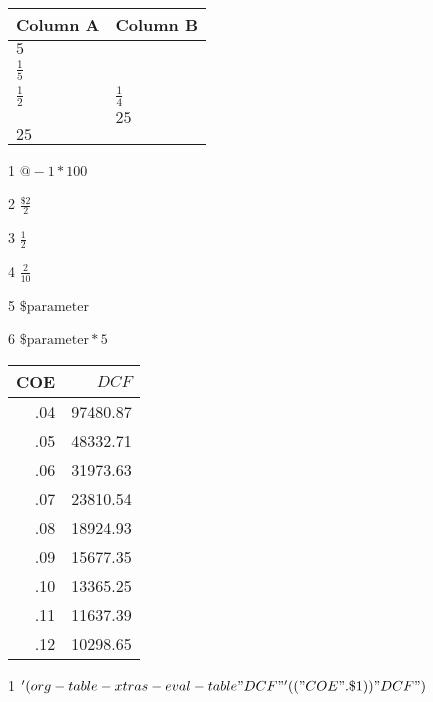 \documentclass[11pt]{article}
\begin{document}
\begin{table}
\centering
\begin{threeparttable}

\begin{tabular}{l|l}
Column A & Column B\\
\hline
\(5\)\tnote{5} & \\
\(\frac{1}{5}\)\tnote{4} & \\
\(\frac{1}{2}\)\tnote{3} & \(\frac{1}{4}\)\tnote{2}\\
 & \(25\)\tnote{1}\\
\(25\)\tnote{6} & \\
\hline
\end{tabular}

\begin{tablenotes}
\item [1] \(@-1*100\)
\item [2] \(\frac{\$2}{2}\)
\item [3] \(\frac{1}{2}\)
\item [4] \(\frac{2}{10}\)
\item [5] \(\mbox{\$parameter}\)
\item [6] \(\mbox{\$parameter}*5\)
\end{tablenotes}

\end{threeparttable}
\end{table}



\begin{table}
\centering
\begin{threeparttable}

\begin{tabular}{rr}
COE & \(DCF\)\tnote{1}\\
\hline
.04 & 97480.87\\
.05 & 48332.71\\
.06 & 31973.63\\
.07 & 23810.54\\
.08 & 18924.93\\
.09 & 15677.35\\
.10 & 13365.25\\
.11 & 11637.39\\
.12 & 10298.65\\
\end{tabular}

\begin{tablenotes}
\item [1] \('(org-table-xtras-eval-table "DCF" '(("COE" . \$1)) "DCF")\)
\end{tablenotes}

\end{threeparttable}
\end{table}
\end{document}
